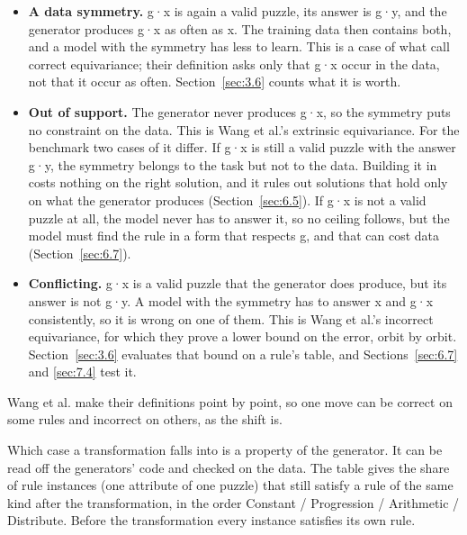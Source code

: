 \begin{itemize}
\item \textbf{A data symmetry.} g·x is again a valid puzzle, its answer is g·y, and the generator produces g·x as often as x. The training data then contains both, and a model with the symmetry has less to learn. This is a case of what \citet{wang2023general} call correct equivariance; their definition asks only that g·x occur in the data, not that it occur as often. Section~\ref{sec:3.6} counts what it is worth.
\item \textbf{Out of support.} The generator never produces g·x, so the symmetry puts no constraint on the data. This is Wang et al.'s extrinsic equivariance. For the benchmark two cases of it differ. If g·x is still a valid puzzle with the answer g·y, the symmetry belongs to the task but not to the data. Building it in costs nothing on the right solution, and it rules out solutions that hold only on what the generator produces (Section~\ref{sec:6.5}). If g·x is not a valid puzzle at all, the model never has to answer it, so no ceiling follows, but the model must find the rule in a form that respects g, and that can cost data (Section~\ref{sec:6.7}).
\item \textbf{Conflicting.} g·x is a valid puzzle that the generator does produce, but its answer is not g·y. A model with the symmetry has to answer x and g·x consistently, so it is wrong on one of them. This is Wang et al.'s incorrect equivariance, for which they prove a lower bound on the error, orbit by orbit. Section~\ref{sec:3.6} evaluates that bound on a rule's table, and Sections~\ref{sec:6.7} and \ref{sec:7.4} test it.
\end{itemize}

Wang et al. make their definitions point by point, so one move can be correct on some rules and incorrect on others, as the shift is.

Which case a transformation falls into is a property of the generator. It can be read off the generators' code and checked on the data. The table gives the share of rule instances (one attribute of one puzzle) that still satisfy a rule of the same kind after the transformation, in the order Constant / Progression / Arithmetic / Distribute. Before the transformation every instance satisfies its own rule.

